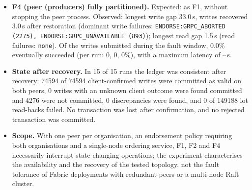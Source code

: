 \begin{itemize}
  \item \textbf{F4 (peer (producers) fully partitioned).} Expected: as F1, without stopping the peer process. Observed: longest write gap
        33.0\,s, writes recovered 3.0\,s after restoration (dominant write failures: \texttt{ENDORSE:GRPC\_ABORTED (2275), ENDORSE:GRPC\_UNAVAILABLE (893)});
        longest read gap 1.5\,s (read failures: \texttt{none}). Of the writes submitted during the fault
        window, 0.0\% eventually succeeded (per run: 0, 0, 0\%), with a
        maximum latency of --\,s.
  \item \textbf{State after recovery.} In 15 of 15 runs the ledger was consistent after recovery:
        74594 of 74594 client-confirmed writes were committed as valid on both peers,
        0 writes with an unknown client outcome were found committed and 4276 were not committed,
        0 discrepancies were found, and 0 of 149188 lot read-backs failed. No transaction was lost after confirmation, and no rejected transaction was committed.
  \item \textbf{Scope.} With one peer per organisation, an endorsement policy requiring both organisations and a single-node
        ordering service, F1, F2 and F4 necessarily interrupt state-changing operations; the experiment characterises the
        availability and the recovery of the tested topology, not the fault tolerance of Fabric deployments with redundant
        peers or a multi-node Raft cluster.
\end{itemize}
